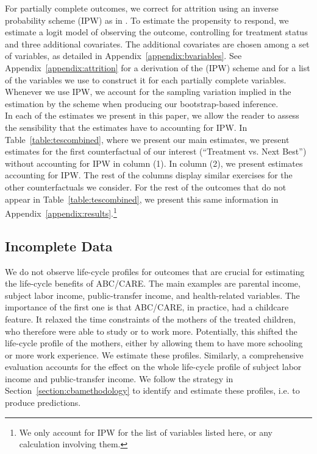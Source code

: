 \noindent For partially complete outcomes, we correct for attrition using an inverse probability scheme (IPW) as in  \citet{Horvitz_Thompson_1952_JASA}. To estimate the propensity to respond, we estimate a logit model of observing the outcome,
controlling for treatment status and three additional covariates. The additional covariates are
chosen among a set of variables, as detailed in Appendix~\ref{appendix:bvariables}. See Appendix~\ref{appendix:attrition} for a derivation of the (IPW) scheme and for a list of the variables we use to construct it for each partially complete variables. Whenever we use IPW, we account for the sampling variation implied in the estimation by the scheme when producing our bootstrap-based inference.\\

\noindent In each of the estimates we present in this paper, we allow the reader to assess the sensibility that the estimates have to accounting for IPW. In Table~\ref{table:tescombined}, where we present our main estimates, we present estimates for the first counterfactual of our interest (``Treatment vs. Next Best'') without accounting for IPW in column (1). In column (2), we present estimates accounting for IPW. The rest of the columns display similar exercises for the other counterfactuals we consider. For the rest of the outcomes that do not appear in Table~\ref{table:tescombined}, we present this same information in Appendix~\ref{appendix:results}.\footnote{We only account for IPW for the list of variables listed here, or any calculation involving them.}

\subsection{Incomplete Data}
\label{app:method_noobs}

\noindent We do not observe life-cycle profiles for outcomes that are crucial for estimating the life-cycle benefits of ABC/CARE. The main examples are parental income, subject labor income, public-transfer income, and health-related variables. The importance of the first one is that ABC/CARE, in practice, had a childcare feature. It relaxed the time constraints of the mothers of the treated children, who therefore were able to study or to work more. Potentially, this shifted the life-cycle profile of the mothers, either by allowing them to have more schooling or more work experience. We estimate these profiles. Similarly, a comprehensive evaluation accounts for the effect on the whole life-cycle profile of subject labor income and public-transfer income. We follow the strategy in Section~\ref{section:cbamethodology} to identify and estimate these profiles, i.e. to produce predictions.

